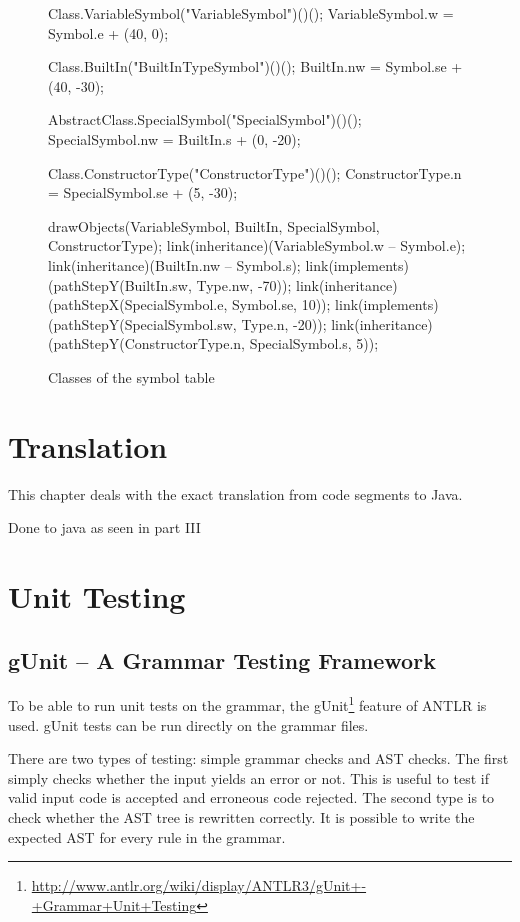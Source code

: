 \begin{figure}[H]
\begin{emp}[classdiag]
	Class.VariableSymbol("VariableSymbol")()();
	VariableSymbol.w = Symbol.e + (40, 0);

	Class.BuiltIn("BuiltInTypeSymbol")()();
	BuiltIn.nw = Symbol.se + (40, -30);

	AbstractClass.SpecialSymbol("SpecialSymbol")()();
	SpecialSymbol.nw = BuiltIn.s + (0, -20);

	Class.ConstructorType("ConstructorType")()();
	ConstructorType.n = SpecialSymbol.se + (5, -30);

	drawObjects(VariableSymbol, BuiltIn, SpecialSymbol, ConstructorType);
	link(inheritance)(VariableSymbol.w -- Symbol.e);
	link(inheritance)(BuiltIn.nw -- Symbol.s);
	link(implements)(pathStepY(BuiltIn.sw, Type.nw, -70));
	link(inheritance)(pathStepX(SpecialSymbol.e, Symbol.se, 10));
	link(implements)(pathStepY(SpecialSymbol.sw, Type.n, -20));
	link(inheritance)(pathStepY(ConstructorType.n, SpecialSymbol.s, 5));





	\end{emp}
	\caption{Classes of the symbol table}
	\label{fig:classes}
\end{figure}

\section{Translation}
\label{ctr:translation}
This chapter deals with the exact translation from \ooplss code segments
to Java.

Done to java as seen in part III


\section{Unit Testing}
\subsection{gUnit -- A Grammar Testing Framework}

To be able to run unit tests on the grammar, the gUnit\footnote{
\href{http://www.antlr.org/wiki/display/ANTLR3/gUnit+-+Grammar+Unit+Testing}
{http://www.antlr.org/wiki/display/ANTLR3/gUnit+-+Grammar+Unit+Testing}}
feature of ANTLR is used. gUnit tests can be run directly on the grammar files.

There are two types of testing: simple grammar checks and AST checks. The 
first simply checks whether the input yields an error or not. This is useful
to test if valid input code is accepted and erroneous code rejected. The
second type is to check whether the AST tree is rewritten correctly. It is 
possible to write the expected AST for every rule in the grammar.\\

